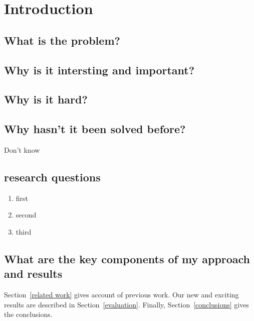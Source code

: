 \section{Introduction}

\subsection{What is the problem?}


\subsection{Why is it intersting and important?}

\subsection{Why is it hard?}


\subsection{Why hasn't it been solved before?}
Don't know

\subsection{research questions}
\begin{enumerate}
\item first
\item second
\item third
\end{enumerate}

\subsection{What are the key components of my approach and results}


Section~\ref{related work} gives account of previous work.
Our new and exciting results are described in Section~\ref{evaluation}.
Finally, Section~\ref{conclusions} gives the conclusions.

